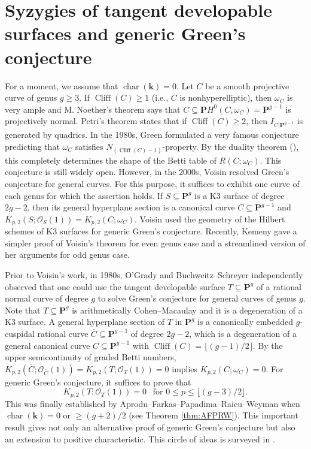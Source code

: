 \documentclass[graybox]{svmult}
\newcommand{\kk}{\mathbf{k}}
\newcommand{\sO}{\mathscr{O}}
\def\nP{\mathbf{P}}
\DeclareMathOperator{\Cliff}{Cliff}
\begin{document}
\section{Syzygies of tangent developable surfaces and generic Green's conjecture}\label{sec:tangent}
For a moment, we assume that $\operatorname{char}(\kk) = 0$. Let $C$ be a smooth projective curve of genus $g \geq 3$. If $\Cliff(C) \geq 1$ (i.e., $C$ is nonhyperelliptic), then $\omega_C$ is very ample and M. Noether's theorem says that $C \subseteq \nP H^0(C, \omega_C)=\nP^{g-1}$ is projectively normal. Petri's theorem states that if $\Cliff(C) \geq 2$, then $I_{C|\nP^{g-1}}$  is generated by quadrics. In the 1980s, Green \cite[Conjecture 5.1]{Green1} formulated a very famous conjecture predicting that $\omega_C$ satisfies $N_{(\Cliff(C)-1)}$-property. By the duality theorem (\cite[Theorem 2.c.1]{Green1}), this completely determines the shape of the Betti table of $R(C; \omega_C)$. This conjecture is still widely open. However, in the 2000s, Voisin \cite{Voisin1,  Voisin2} resolved Green's conjecture for general curves. For this purpose, it suffices to exhibit one curve of each genus for which the assertion holds. If $S \subseteq \nP^g$ is a K3 surface of degree $2g-2$, then its general hyperplane section is a canonical curve $C \subseteq \nP^{g-1}$ and $K_{p,2}(S; \sO_S(1)) = K_{p,2}(C; \omega_C)$. Voisin used the geometry of the Hilbert schemes of K3 surfaces for generic Green's conjecture. Recently, Kemeny \cite{Kemeny} gave a simpler proof of Voisin's theorem for even genus case and a streamlined version of her arguments for odd genus case.  

Prior to Voisin's work,  in 1980s, O'Grady and Buchweitz--Schreyer independently observed that one could use the tangent developable surface $T \subseteq \nP^g$ of a rational normal curve of degree $g$ to solve Green's conjecture for general curves of genus $g$. Note that $T \subseteq \nP^g$ is arithmetically Cohen--Macaulay and it is a degeneration of a K3 surface. A general hyperplane section of $T$ in $\nP^g$ is a canonically embedded $g$-cuspidal rational curve $\overline{C} \subseteq \nP^{g-1}$ of degree $2g-2$, which is a degeneration of a general canonical curve $C \subseteq \nP^{g-1}$ with $\Cliff(C) = \lfloor (g-1)/2 \rfloor$. By the upper semicontinuity of graded Betti numbers, $K_{p,2}(\overline{C}; \sO_{\overline{C}}(1)) = K_{p, 2}(T; \sO_T(1)) = 0$ implies $K_{p,2}(C; \omega_C)=0$. For generic Green's conjecture, it suffices to prove that
$$
K_{p,2}(T; \sO_T(1))=0~~\text{ for $0 \leq p \leq \lfloor (g-3)/2 \rfloor$}.
$$
This was finally established by Aprodu--Farkas--Papadima--Raicu--Weyman \cite{AFPRW} when $\operatorname{char}(\kk) = 0$ or $\geq (g+2)/2$ (see Theorem \ref{thm:AFPRW}). This important result gives not only an alternative proof of generic Green's conjecture but also an extension to positive characteristic. This circle of ideas is surveyed in \cite{EL4}.
\end{document}
